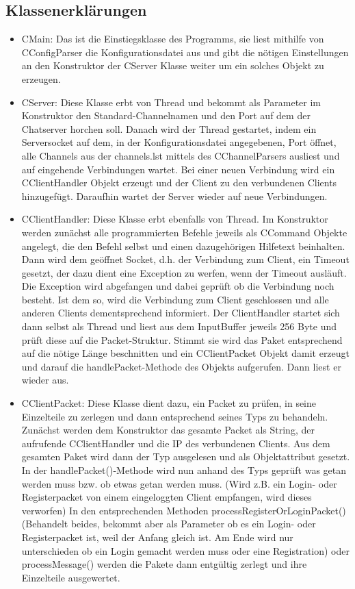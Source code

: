 \documentclass[a4paper,12pt]{scrartcl}
\begin{document}
\subsection{Klassenerklärungen}
\begin{itemize}
\item CMain: Das ist die Einstiegsklasse des Programms, sie liest mithilfe von CConfigParser die Konfigurationsdatei aus und gibt die nötigen Einstellungen an den Konstruktor der CServer Klasse weiter um ein solches Objekt zu erzeugen.
\item CServer: Diese Klasse erbt von Thread und bekommt als Parameter im Konstruktor den Standard-Channelnamen und den Port auf dem der Chatserver horchen soll. Danach wird der Thread gestartet, indem ein Serversocket auf dem, in der Konfigurationsdatei angegebenen, Port öffnet, alle Channels aus der channels.lst mittels des CChannelParsers ausliest und auf eingehende Verbindungen wartet. Bei einer neuen Verbindung wird ein CClientHandler Objekt erzeugt und der Client zu den verbundenen Clients hinzugefügt. Daraufhin wartet der Server wieder auf neue Verbindungen.
\item CClientHandler: Diese Klasse erbt ebenfalls von Thread. Im Konstruktor werden zunächst alle programmierten Befehle jeweils als CCommand Objekte angelegt, die den Befehl selbst und einen dazugehörigen Hilfetext beinhalten. Dann wird dem geöffnet Socket, d.h. der Verbindung zum Client, ein Timeout gesetzt, der dazu dient eine Exception zu werfen, wenn der Timeout ausläuft. Die Exception wird abgefangen und dabei geprüft ob die Verbindung noch besteht. Ist dem so, wird die Verbindung zum Client geschlossen und alle anderen Clients dementsprechend informiert. Der ClientHandler startet sich dann selbst als Thread und liest aus dem InputBuffer jeweils 256 Byte und prüft diese auf die Packet-Struktur. Stimmt sie wird das Paket entsprechend auf die nötige Länge beschnitten und ein CClientPacket Objekt damit erzeugt und darauf die handlePacket-Methode des Objekts aufgerufen. Dann liest er wieder aus.
\item CClientPacket: Diese Klasse dient dazu, ein Packet zu prüfen, in seine Einzelteile zu zerlegen und dann entsprechend seines Typs zu behandeln. Zunächst werden dem Konstruktor das gesamte Packet als String, der aufrufende CClientHandler und die IP des verbundenen Clients. Aus dem gesamten Paket wird dann der Typ ausgelesen und als Objektattribut gesetzt. In der handlePacket()-Methode wird nun anhand des Typs geprüft was getan werden muss bzw. ob etwas getan werden muss. (Wird z.B. ein Login- oder Registerpacket von einem eingeloggten Client empfangen, wird dieses verworfen) In den entsprechenden Methoden processRegisterOrLoginPacket() (Behandelt beides, bekommt aber als Parameter ob es ein Login- oder Registerpacket ist, weil der Anfang gleich ist. Am Ende wird nur unterschieden ob ein Login gemacht werden muss oder eine Registration) oder processMessage() werden die Pakete dann entgültig zerlegt und ihre Einzelteile ausgewertet.

\end{itemize}
\end{document}
